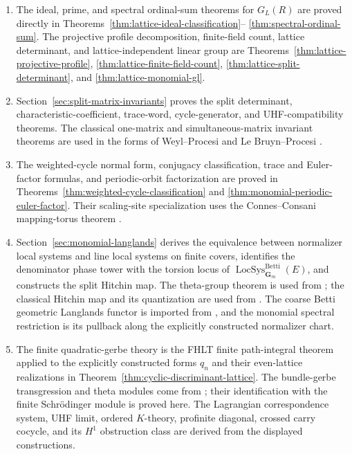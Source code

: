 \documentclass[11pt]{amsart}
\numberwithin{equation}{section}
\theoremstyle{definition}
\newcommand{\LocSys}{\operatorname{LocSys}}
\newcommand{\Gm}{\mathbf G_m}
\begin{document}
\begin{enumerate}[label=\textup{(\arabic*)},leftmargin=3.2em]
\item The ideal, prime, and spectral ordinal-sum theorems for $G_L(R)$
are proved directly in
Theorems~\ref{thm:lattice-ideal-classification}--
\ref{thm:spectral-ordinal-sum}.  The projective profile decomposition,
finite-field count, lattice determinant, and lattice-independent linear
group are Theorems~\ref{thm:lattice-projective-profile},
\ref{thm:lattice-finite-field-count},
\ref{thm:lattice-split-determinant}, and
\ref{thm:lattice-monomial-gl}.

\item Section~\ref{sec:split-matrix-invariants} proves the split determinant,
characteristic-coefficient, trace-word, cycle-generator, and UHF-compatibility
theorems.  The classical one-matrix and simultaneous-matrix invariant
theorems are used in the forms of Weyl--Procesi and Le Bruyn--Procesi
\cite{WeylClassical,ProcesiMatrices,LeBruynProcesi}.

\item The weighted-cycle normal form, conjugacy classification, trace and
Euler-factor formulas, and periodic-orbit factorization are proved in
Theorems~\ref{thm:weighted-cycle-classification} and
\ref{thm:monomial-periodic-euler-factor}.  Their scaling-site specialization
uses the Connes--Consani mapping-torus theorem \cite{CCKnotsPrimes}.

\item Section~\ref{sec:monomial-langlands} derives the equivalence between
normalizer local systems and line local systems on finite covers, identifies
the denominator phase tower with the torsion locus of
$\LocSys_{\Gm}^{\mathrm{Betti}}(E)$, and constructs the split Hitchin map.
The theta-group theorem is used from \cite{MumfordTheta}; the classical
Hitchin map and its quantization are used from
\cite{HitchinSystems,EtingofLiuHitchin}.  The coarse Betti geometric
Langlands functor is imported from \cite{GaitsgoryRaskinGLI}, and the
monomial spectral restriction is its pullback along the explicitly
constructed normalizer chart.

\item The finite quadratic-gerbe theory is the FHLT finite path-integral
theorem \cite{FHLT} applied to the explicitly constructed forms $q_n$ and
their even-lattice realizations in
Theorem~\ref{thm:cyclic-discriminant-lattice}.
The bundle-gerbe transgression and theta modules come from
\cite{GerbeTheta}; their identification with the finite Schr\"odinger
module is proved here.  The Lagrangian correspondence system, UHF limit,
ordered $K$-theory, profinite diagonal, crossed carry cocycle, and its
$H^1$ obstruction class are derived from the displayed constructions.


\end{enumerate}
\end{document}
